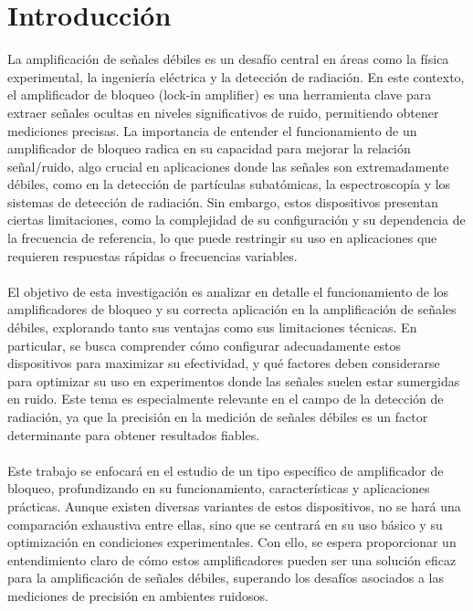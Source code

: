 \chapter*{Introducción} %
La amplificación de señales débiles es un desafío central en áreas como la física experimental, la ingeniería eléctrica y la detección de radiación. En este contexto, el amplificador de bloqueo (lock-in amplifier) es una herramienta clave para extraer señales ocultas en niveles significativos de ruido, permitiendo obtener mediciones precisas. La importancia de entender el funcionamiento de un amplificador de bloqueo radica en su capacidad para mejorar la relación señal/ruido, algo crucial en aplicaciones donde las señales son extremadamente débiles, como en la detección de partículas subatómicas, la espectroscopía y los sistemas de detección de radiación. Sin embargo, estos dispositivos presentan ciertas limitaciones, como la complejidad de su configuración y su dependencia de la frecuencia de referencia, lo que puede restringir su uso en aplicaciones que requieren respuestas rápidas o frecuencias variables.\\
\\
El objetivo de esta investigación es analizar en detalle el funcionamiento de los amplificadores de bloqueo y su correcta aplicación en la amplificación de señales débiles, explorando tanto sus ventajas como sus limitaciones técnicas. En particular, se busca comprender cómo configurar adecuadamente estos dispositivos para maximizar su efectividad, y qué factores deben considerarse para optimizar su uso en experimentos donde las señales suelen estar sumergidas en ruido. Este tema es especialmente relevante en el campo de la detección de radiación, ya que la precisión en la medición de señales débiles es un factor determinante para obtener resultados fiables.\\
\\
Este trabajo se enfocará en el estudio de un tipo específico de amplificador de bloqueo, profundizando en su funcionamiento, características y aplicaciones prácticas. Aunque existen diversas variantes de estos dispositivos, no se hará una comparación exhaustiva entre ellas, sino que se centrará en su uso básico y su optimización en condiciones experimentales. Con ello, se espera proporcionar un entendimiento claro de cómo estos amplificadores pueden ser una solución eficaz para la amplificación de señales débiles, superando los desafíos asociados a las mediciones de precisión en ambientes ruidosos.
\newpage
